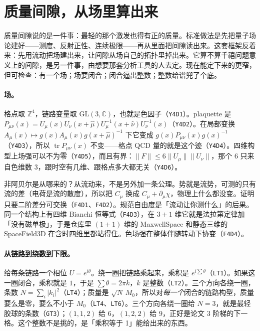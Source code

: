 \documentclass[aps,prd,preprint,superscriptaddress,amsmath,amssymb]{revtex4-2}
\begin{document}
\section{质量间隙，从场里算出来}
\label{sec:ymstatus}

质量间隙说的是一件事：最轻的那个激发也得有正的质量。标准做法是先把量子场论建好——测度、反射正性、连续极限——再从里面把间隙读出来。这套框架反着来：先用流动把场建出来，让间隙从场自己的拓扑里掉出来。它算不算千禧问题意义上的间隙，是另一件事，由想要那套分析工具的人去定。现在能定下来的更窄，但可检查：有一个场；场要闭合；闭合逼出整数；整数给谱兜了个底。

\paragraph{场。}
格点取 $\mathbb{Z}^4$，链路变量取 $\mathrm{GL}(3,\mathbb{C})$，也就是色因子（\texttt{Y4D1}）。plaquette 是 $P_{\mu\nu}(x)=U_\mu(x)U_\nu(x+\hat\mu)U^{-1}_\mu(x+\hat\nu)U^{-1}_\nu(x)$（\texttt{Y4D2}）。在局部变换 $A_\mu(x)\mapsto g(x)A_\mu(x)g(x+\hat\mu)^{-1}$ 下它变成 $g(x)P_{\mu\nu}(x)g(x)^{-1}$（\texttt{Y4D3}），所以 $\operatorname{tr}P_{\mu\nu}(x)$ 不变——格点 QCD 量的就是这个迹（\texttt{Y4D4}）。四维构型上场强可以不为零（\texttt{Y4D5}），而且有界：$\|F\|\le 6\|U_\mu\|\|U_\nu\|$，那个 $6$ 只来自色维数 $3$，跟时空有几维、跟格点多大都无关（\texttt{Y4D6}）。

非阿贝尔是从哪来的？从流动来，不是另外加一条公理。势就是流势，可测的只有流的差（电荷是流的散度），所以把 $C_\mu$ 换成 $C_\mu+\partial_\mu\chi$，物理上什么都没变。证明只要二阶差分可交换（\texttt{F4D1}、\texttt{F4D2}）。规范自由度是「流动让你测什么」的后果。同一个结构上有四维 Bianchi 恒等式（\texttt{F4D3}），在 $3+1$ 维它就是法拉第定律加「没有磁单极」，于是仓库里 $(1+1)$ 维的 MaxwellSpace 和静态三维的 SpaceField3D 在含时四维里都站得住。色场强在整体伴随转动下协变（\texttt{F4D4}）。

\paragraph{从链路到绕数到下限。}
给每条链路一个相位 $U=e^{i\theta}$。绕一圈把链路乘起来，乘积是 $e^{i\sum\theta}$（\texttt{LT1}）。如果这一圈闭合，乘积就是 $1$，于是 $\sum\theta=2\pi k$，$k$ 是整数（\texttt{LT2}）。三个方向各绕一圈，条数 $N=\sum_i|k_i|^2$（\texttt{LT4}）；质量是 $\sqrt N\,M_0$，所以对\emph{每一个}闭合的链路构型，质量要么是零，要么不小于 $M_0$（\texttt{LT4}、\texttt{LT6}）。三个方向各绕一圈给 $N=3$，就是最轻胶球的条数（\texttt{GT3}）；$(1,1,2)$ 给 $6$，$(1,2,2)$ 给 $9$，正好是论文 3 阶梯的下一格。这个整数不是挑的，是「乘积等于 1」能给出来的东西。
\end{document}
